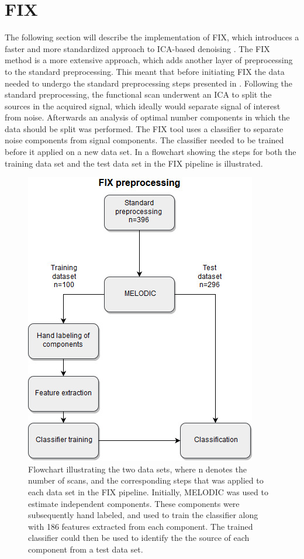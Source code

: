 
\section{FIX}

The following section will describe the implementation of FIX, which introduces a faster and more standardized approach to ICA-based denoising \cite{Salimi-Khorshidi2014}. The FIX method is a more extensive approach, which adds another layer of preprocessing to the standard preprocessing. This meant that before initiating FIX the data needed to undergo the standard preprocessing steps presented in . Following the standard preprocessing, the functional scan underwent an ICA to split the sources in the acquired signal, which ideally would separate signal of interest from noise. Afterwards an analysis of optimal number components in which the data should be split was performed. The FIX tool uses a classifier to separate noise components from signal components. The classifier needed to be trained before it applied on a new data set. In  a flowchart showing the steps for both the training data set and the test data set in the FIX pipeline is illustrated. 


\begin{figure}[H]                 
	\includegraphics[width=.6\textwidth]{figures/bMethods/FIX_flow} 
	\caption{Flowchart illustrating the two data sets, where n denotes the number of scans, and the corresponding steps that was applied to each data set in the FIX pipeline. Initially, MELODIC was used to estimate independent components. These components were subsequently hand labeled, and used to train the classifier along with 186 features extracted from each component. The trained classifier could then be used to identify the the source of each component from a test data set.}
	\label{fig:meth:fix} 
\end{figure}

